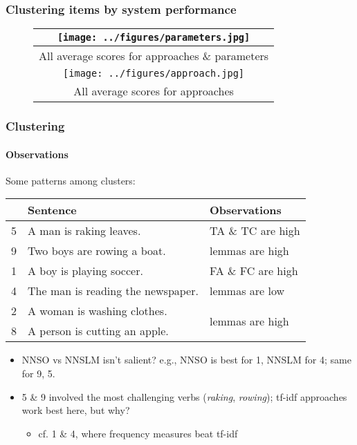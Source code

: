\documentclass{beamer}
\begin{document}
\begin{frame}[noframenumbering]
\frametitle{Clustering items by system performance}
\footnotesize
\begin{figure}[width=0.9\columnwidth]
\begin{center}
\begin{tabular}{|c|}
\hline
\texttt{[image: ../figures/parameters.jpg]} \\
\hline
All average scores for approaches \& parameters\\
\hline
\hline
\texttt{[image: ../figures/approach.jpg]} \\
\hline
All average scores for approaches \\
\hline
\end{tabular}
\end{center}
\end{figure}
\end{frame}

\begin{frame}[noframenumbering]
\frametitle{Clustering}
\framesubtitle{Observations}
Some patterns among clusters: 
\begin{center}
\footnotesize
\begin{tabular}{|r|l||l|}
\hline
 & Sentence & Observations \\
\hline
\hline
5 & A man is raking leaves. & TA \& TC are high\\
\cline{1-2}
9 & Two boys are rowing a boat. & lemmas are high\\
\hline
\hline
1 & A boy is playing soccer. & FA \& FC are high\\
\cline{1-2}
4 & The man is reading the newspaper. & lemmas are low\\
\hline
\hline
2 & A woman is washing clothes. & \multirow{2}{*}{lemmas are high} \\
\cline{1-2}
8 & A person is cutting an apple. & \\
\hline
\end{tabular}
\end{center}
\begin{itemize}
\item NNSO vs NNSLM isn't salient? e.g., NNSO is best for 1, NNSLM for 4; same for 9, 5.
\item 5 \& 9 involved the most challenging verbs (\textit{raking}, \textit{rowing}); tf-idf approaches work best here, but why?
\begin{itemize}
\item cf. 1 \& 4, where frequency measures beat tf-idf
\end{itemize}
\end{itemize}
\end{frame}
\end{document}
